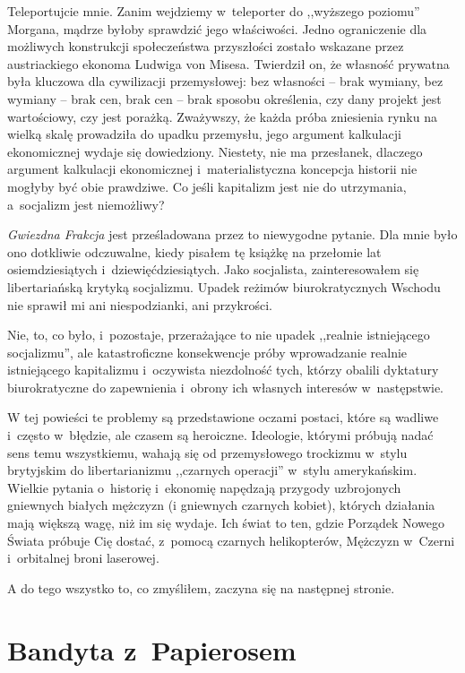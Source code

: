 \documentclass[oneside,polish,11pt,sfheadings]{mwbk}
\begin{document}
Teleportujcie mnie. Zanim wejdziemy w~teleporter do ,,wyższego poziomu''
Morgana, mądrze byłoby sprawdzić jego właściwości. Jedno ograniczenie
dla możliwych konstrukcji społeczeństwa przyszłości zostało wskazane
przez austriackiego ekonoma Ludwiga von Misesa. Twierdził on, że własność
prywatna była kluczowa dla cywilizacji przemysłowej: bez własności --
brak wymiany, bez wymiany -- brak cen, brak cen -- brak sposobu
określenia, czy dany projekt jest wartościowy, czy jest porażką.
Zważywszy, że każda próba zniesienia rynku na wielką skalę prowadziła do
upadku przemysłu, jego argument kalkulacji ekonomicznej wydaje się
dowiedziony. Niestety, nie ma przesłanek, dlaczego argument kalkulacji
ekonomicznej i~materialistyczna koncepcja historii nie mogłyby być obie
prawdziwe. Co jeśli kapitalizm jest nie do utrzymania, a~socjalizm jest niemożliwy?

\emph{Gwiezdna Frakcja} jest prześladowana przez to niewygodne pytanie.
Dla mnie było ono dotkliwie odczuwalne, kiedy pisałem tę książkę na
przełomie lat osiemdziesiątych i~dziewięćdziesiątych. Jako socjalista,
zainteresowałem się libertariańską krytyką socjalizmu. Upadek reżimów
biurokratycznych Wschodu nie sprawił mi ani niespodzianki, ani
przykrości.

Nie, to, co było, i~pozostaje, przerażające to nie upadek ,,realnie
istniejącego socjalizmu'', ale katastroficzne konsekwencje próby
wprowadzanie realnie istniejącego kapitalizmu i~oczywista niezdolność
tych, którzy obalili dyktatury biurokratyczne do zapewnienia i~obrony
ich własnych interesów w~następstwie.

W tej powieści te problemy są przedstawione oczami postaci, które są
wadliwe i~często w~błędzie, ale czasem są heroiczne. Ideologie, którymi
próbują nadać sens temu wszystkiemu, wahają się od przemysłowego
trockizmu w~stylu brytyjskim do libertarianizmu ,,czarnych operacji'' w~stylu amerykańskim. Wielkie pytania o~historię i~ekonomię napędzają
przygody uzbrojonych gniewnych białych mężczyzn (i gniewnych czarnych
kobiet), których działania mają większą wagę, niż im się wydaje. Ich
świat to ten, gdzie Porządek Nowego Świata próbuje Cię dostać, z~pomocą
czarnych helikopterów, Mężczyzn w~Czerni i~orbitalnej broni laserowej.

A do tego wszystko to, co zmyśliłem, zaczyna się na następnej stronie.



\chapter{Bandyta z~Papierosem}
\end{document}
